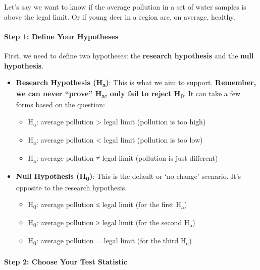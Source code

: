 \documentclass[
  letterpaper,
  DIV=11,
  numbers=noendperiod]{scrartcl}
\let\oldparagraph\paragraph
\renewcommand{\paragraph}[1]{\oldparagraph{#1}\mbox{}}
\providecommand{\tightlist}{%
  \setlength{\itemsep}{0pt}\setlength{\parskip}{0pt}}\usepackage{longtable,booktabs,array}
\begin{document}
Let's say we want to know if the average pollution in a set of water
samples is above the legal limit. Or if young deer in a region are, on
average, healthy.

\hypertarget{step-1-define-your-hypotheses}{%
\paragraph{Step 1: Define Your
Hypotheses}\label{step-1-define-your-hypotheses}}

First, we need to define two hypotheses: the \textbf{research
hypothesis} and the \textbf{null hypothesis}.

\begin{itemize}
\tightlist
\item
  \textbf{Research Hypothesis (H\textsubscript{a})}: This is what we aim
  to support. \textbf{Remember, we can never ``prove''
  H\textsubscript{a}, only fail to reject H\textsubscript{0}}. It can
  take a few forms based on the question:

  \begin{itemize}
  \tightlist
  \item
    H\textsubscript{a}: average pollution \textgreater{} legal limit
    (pollution is too high)
  \item
    H\textsubscript{a}: average pollution \textless{} legal limit
    (pollution is too low)
  \item
    H\textsubscript{a}: average pollution ≠ legal limit (pollution is
    just different)
  \end{itemize}
\item
  \textbf{Null Hypothesis (H\textsubscript{0})}: This is the default or
  `no change' scenario. It's opposite to the research hypothesis.

  \begin{itemize}
  \tightlist
  \item
    H\textsubscript{0}: average pollution ≤ legal limit (for the first
    H\textsubscript{a})
  \item
    H\textsubscript{0}: average pollution ≥ legal limit (for the second
    H\textsubscript{a})
  \item
    H\textsubscript{0}: average pollution = legal limit (for the third
    H\textsubscript{a})
  \end{itemize}
\end{itemize}

\hypertarget{step-2-choose-your-test-statistic}{%
\paragraph{Step 2: Choose Your Test
Statistic}\label{step-2-choose-your-test-statistic}}
\end{document}
